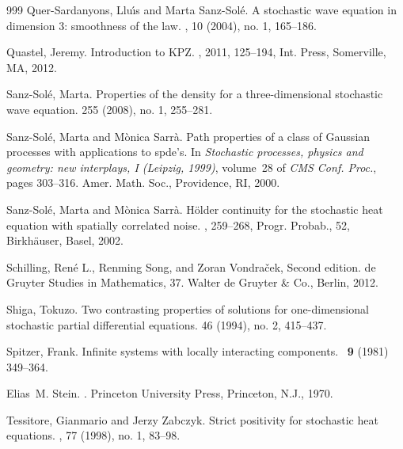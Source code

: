 \documentclass[a4paper,12pt]{article}
\theoremstyle{plain}
\theoremstyle{definition}
\begin{document}
\begin{thebibliography}{999}
Quer-Sardanyons, Llu{\'{\i}}s and Marta Sanz-Sol{\'e}.
\newblock A stochastic wave equation in dimension 3: smoothness of the law.
, 10 (2004), no. 1, 165--186. 

Quastel, Jeremy.
\newblock Introduction to KPZ.
, 2011, 125--194, Int. Press, Somerville, MA, 2012.

Sanz-Sol\'e, Marta.
\newblock Properties of the density for a three-dimensional stochastic wave equation. 
 255 (2008), no. 1, 255--281.

Sanz-Sol{\'e}, Marta and M{\`o}nica Sarr{\`a}.
\newblock Path properties of a class of {G}aussian processes with applications to spde's.
\newblock In {\em Stochastic processes, physics and geometry: new interplays,
  {I} ({L}eipzig, 1999)}, volume~28 of {\em CMS Conf. Proc.}, pages 303--316.
  Amer. Math. Soc., Providence, RI, 2000.

Sanz-Sol\'e, Marta and M\`onica Sarr\`a.
\newblock H\"older continuity for the stochastic heat equation with spatially correlated noise.
, 259--268, Progr. Probab., 52, Birkhäuser, Basel, 2002.

Schilling, Ren\'e L., Renming Song, and Zoran Vondra{\v{c}}ek, 
\newblock Second edition. de Gruyter Studies in Mathematics, 37. Walter de Gruyter \& Co., Berlin, 2012.


Shiga, Tokuzo.
\newblock Two contrasting properties of solutions for one-dimensional stochastic partial differential equations.
 46 (1994), no. 2, 415--437.

Spitzer, Frank.
\newblock Infinite systems with locally interacting components.
\ {\bf 9} (1981) 349--364.

Elias~M. Stein.
.
\newblock Princeton University Press, Princeton, N.J., 1970.

Tessitore, Gianmario and Jerzy Zabczyk.
\newblock Strict positivity for stochastic heat equations.
, 77 (1998), no. 1, 83--98. 
 

\end{thebibliography}
\end{document}
